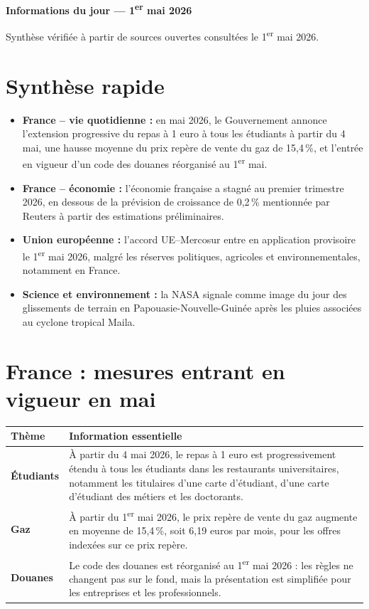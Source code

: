 \documentclass[11pt,a4paper]{article}
\begin{document}
{\Large\bfseries\color{titleblue} Informations du jour --- 1\textsuperscript{er} mai 2026}\par
{\small Synthèse vérifiée à partir de sources ouvertes consultées le 1\textsuperscript{er} mai 2026.}\vspace{0.6em}

\section*{Synthèse rapide}
\begin{itemize}[leftmargin=1.2em,itemsep=0.25em]
    \item \textbf{France -- vie quotidienne :} en mai 2026, le Gouvernement annonce l'extension progressive du repas à 1 euro à tous les étudiants à partir du 4 mai, une hausse moyenne du prix repère de vente du gaz de 15,4\,\%, et l'entrée en vigueur d'un code des douanes réorganisé au 1\textsuperscript{er} mai.
    \item \textbf{France -- économie :} l'économie française a stagné au premier trimestre 2026, en dessous de la prévision de croissance de 0,2\,\% mentionnée par Reuters à partir des estimations préliminaires.
    \item \textbf{Union européenne :} l'accord UE--Mercosur entre en application provisoire le 1\textsuperscript{er} mai 2026, malgré les réserves politiques, agricoles et environnementales, notamment en France.
    \item \textbf{Science et environnement :} la NASA signale comme image du jour des glissements de terrain en Papouasie-Nouvelle-Guinée après les pluies associées au cyclone tropical Maila.
\end{itemize}

\section*{France : mesures entrant en vigueur en mai}
\begin{tabularx}{\textwidth}{>{\bfseries}p{}X}
\toprule
Thème & Information essentielle \\
\midrule
Étudiants & À partir du 4 mai 2026, le repas à 1 euro est progressivement étendu à tous les étudiants dans les restaurants universitaires, notamment les titulaires d'une carte d'étudiant, d'une carte d'étudiant des métiers et les doctorants. \\
Gaz & À partir du 1\textsuperscript{er} mai 2026, le prix repère de vente du gaz augmente en moyenne de 15,4\,\%, soit 6,19 euros par mois, pour les offres indexées sur ce prix repère. \\
Douanes & Le code des douanes est réorganisé au 1\textsuperscript{er} mai 2026 : les règles ne changent pas sur le fond, mais la présentation est simplifiée pour les entreprises et les professionnels. \\
\bottomrule
\end{tabularx}
\end{document}
